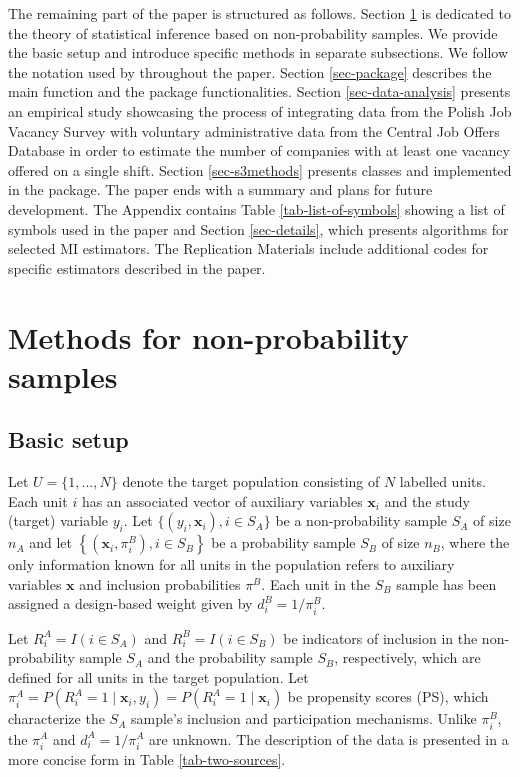 \documentclass[
]{jss}
\begin{document}
The remaining part of the paper is structured as follows. Section
\ref{sec-methods} is dedicated to the theory of statistical inference
based on non-probability samples. We provide the basic setup and
introduce specific methods in separate subsections. We follow the
notation used by \citet{wu2022statistical} throughout the paper. Section
\ref{sec-package} describes the main function and the package
functionalities. Section \ref{sec-data-analysis} presents an empirical
study showcasing the process of integrating data from the Polish Job
Vacancy Survey with voluntary administrative data from the Central Job
Offers Database in order to estimate the number of companies with at
least one vacancy offered on a single shift. Section \ref{sec-s3methods}
presents classes and  implemented in the package. The
paper ends with a summary and plans for future development. The Appendix
contains Table \ref{tab-list-of-symbols} showing a list of symbols used
in the paper and Section \ref{sec-details}, which presents algorithms
for selected MI estimators. The Replication Materials include additional
codes for specific estimators described in the paper.

\section{Methods for non-probability samples}\label{sec-methods}

\subsection{Basic setup}\label{basic-setup}

Let \(U=\{1,..., N\}\) denote the target population consisting of \(N\)
labelled units. Each unit \(i\) has an associated vector of auxiliary
variables \(\boldsymbol{x}_{i}\) and the study (target) variable
\(y_{i}\). Let \(\{ (y_i, \boldsymbol{x}_i), i \in S_A\}\) be a
non-probability sample \(S_A\) of size \(n_A\) and let
\(\left\{\left(\boldsymbol{x}_i, \pi_{i}^B\right), i \in S_B\right\}\)
be a probability sample \(S_B\) of size \(n_B\), where the only
information known for all units in the population refers to auxiliary
variables \(\boldsymbol{x}\) and inclusion probabilities \(\pi^B\). Each
unit in the \(S_B\) sample has been assigned a design-based weight given
by \(d_i^B = 1/\pi_i^B\).

Let \(R_i^A=I(i \in S_A)\) and \(R_i^B=I(i \in S_B)\) be indicators of
inclusion in the non-probability sample \(S_A\) and the probability
sample \(S_B\), respectively, which are defined for all units in the
target population. Let
\(\pi_i^A=P(R_i^A=1 \mid \boldsymbol{x}_i, y_i)=P(R_i^A=1 \mid \boldsymbol{x}_i)\)
be propensity scores (PS), which characterize the \(S_A\) sample's
inclusion and participation mechanisms. Unlike \(\pi_i^B\), the
\(\pi_i^A\) and \(d_i^A=1/\pi_i^A\) are unknown. The description of the
data is presented in a more concise form in Table \ref{tab-two-sources}.
\end{document}
